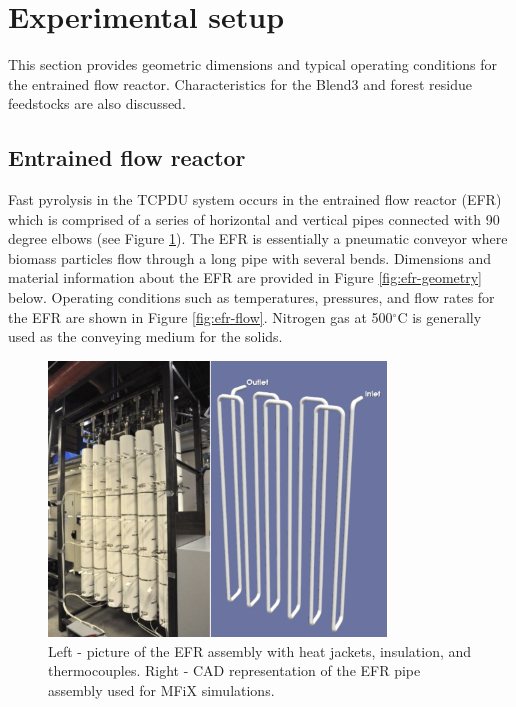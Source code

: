 
\section{Experimental setup}

This section provides geometric dimensions and typical operating conditions for the entrained flow reactor. Characteristics for the Blend3 and forest residue feedstocks are also discussed.

\subsection{Entrained flow reactor}

Fast pyrolysis in the TCPDU system occurs in the entrained flow reactor (EFR) which is comprised of a series of horizontal and vertical pipes connected with 90 degree elbows (see Figure \ref{fig:efr-assembly}). The EFR is essentially a pneumatic conveyor where biomass particles flow through a long pipe with several bends. Dimensions and material information about the EFR are provided in Figure \ref{fig:efr-geometry} below. Operating conditions such as temperatures, pressures, and flow rates for the EFR are shown in Figure \ref{fig:efr-flow}. Nitrogen gas at 500$^{\circ}$C is generally used as the conveying medium for the solids.

\begin{figure}[H]
	\centering
	\includegraphics[width=0.8\textwidth]{figures/efr-assembly.png}
	\caption{Left - picture of the EFR assembly with heat jackets, insulation, and thermocouples. Right - CAD representation of the EFR pipe assembly used for MFiX simulations.}
	\label{fig:efr-assembly}
\end{figure}

